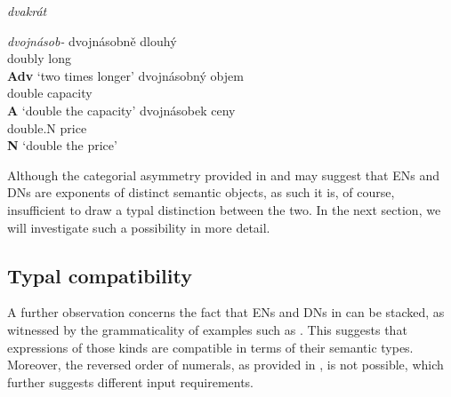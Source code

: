 \documentclass[output=paper,modfonts,hidelinks,newtxmath
\ChapterDOI{10.5281/zenodo.2545513}
]{langscibook}
\begin{document}
\begin{multicols}{2}
\ea \textit{dvakrát}\label{dvakrat-morphology}

\z
\z
\columnbreak
%
\ea \textit{dvojnásob-}\label{dvojnasobne-morphology} 
\ea \gll dvojnásobně dlouhý\\
doubly long\\\hfill\textbf{Adv}
\glt `two times longer'
\ex \gll dvojnásobný objem\\
double capacity\\\hfill\textbf{A}
\glt `double the capacity'
\ex \gll dvojnásobek ceny\\
double.N price\\\hfill\textbf{N}
\glt `double the price'
\z \z

\end{multicols}
\vspace{3mm}

\noindent Although the categorial asymmetry provided in  and  may suggest that ENs and DNs are exponents of distinct semantic objects, as such it is, of course, insufficient to draw a typal distinction between the two. In the next section, we will investigate such a possibility in more detail.

\subsection{Typal compatibility}\label{typal-compatibility}

A further observation concerns the fact that ENs and DNs in  can be stacked, as witnessed by the grammaticality of examples such as . This suggests that  expressions of those kinds are compatible in terms of their semantic types. Moreover, the reversed order of numerals, as provided in , is not possible, which further suggests different input requirements.
\end{document}
